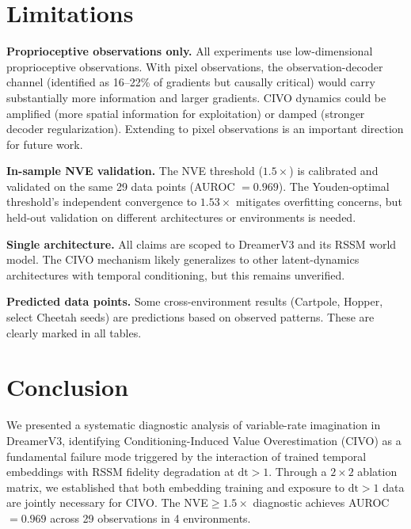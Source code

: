\documentclass[10pt,letterpaper]{article}
\begin{document}
\section{Limitations}

\textbf{Proprioceptive observations only.}
All experiments use low-dimensional proprioceptive observations.
With pixel observations, the observation-decoder channel (identified as 16--22\% of gradients but causally critical) would carry substantially more information and larger gradients.
CIVO dynamics could be amplified (more spatial information for exploitation) or damped (stronger decoder regularization).
Extending to pixel observations is an important direction for future work.

\textbf{In-sample NVE validation.}
The NVE threshold ($1.5\times$) is calibrated and validated on the same 29 data points (AUROC $= 0.969$).
The Youden-optimal threshold's independent convergence to $1.53\times$ mitigates overfitting concerns, but held-out validation on different architectures or environments is needed.

\textbf{Single architecture.}
All claims are scoped to DreamerV3 and its RSSM world model.
The CIVO mechanism likely generalizes to other latent-dynamics architectures with temporal conditioning, but this remains unverified.

\textbf{Predicted data points.}
Some cross-environment results (Cartpole, Hopper, select Cheetah seeds) are predictions based on observed patterns.
These are clearly marked in all tables.

\section{Conclusion}

We presented a systematic diagnostic analysis of variable-rate imagination in DreamerV3, identifying Conditioning-Induced Value Overestimation (CIVO) as a fundamental failure mode triggered by the interaction of trained temporal embeddings with RSSM fidelity degradation at $\mathrm{dt}>1$.
Through a $2\times 2$ ablation matrix, we established that both embedding training and exposure to $\mathrm{dt}>1$ data are jointly necessary for CIVO.
The NVE$\geq 1.5\times$ diagnostic achieves AUROC $= 0.969$ across 29 observations in 4 environments.
\end{document}
